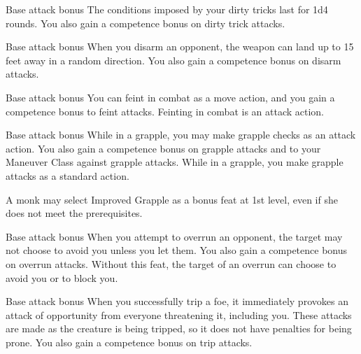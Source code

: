  Base attack bonus 
 The conditions imposed by your dirty tricks last for 1d4 rounds. You also gain a  competence bonus on dirty trick attacks.

 Base attack bonus 
 When you disarm an opponent, the weapon can land up to 15 feet away in a random direction. You also gain a  competence bonus on disarm attacks.

 Base attack bonus 
 You can feint in combat as a move action, and you gain a  competence bonus to feint attacks.
 Feinting in combat is an attack action.

 Base attack bonus 
 While in a grapple, you may make grapple checks as an attack action. You also gain a  competence bonus on grapple attacks and to your Maneuver Class against grapple attacks.
 While in a grapple, you make grapple attacks as a standard action.
\par A monk may select Improved Grapple as a bonus feat at 1st level, even if she does not meet the prerequisites.

 Base attack bonus 
 When you attempt to overrun an opponent, the target may not choose to avoid you unless you let them. You also gain a  competence bonus on overrun attacks.
 Without this feat, the target of an overrun can choose to avoid you or to block you.

\begin{comment}
\feat{Improved Sunder}{Combat, Maneuver}
\parhead{Prerequisites} Base attack bonus \plus4
\parhead{Benefit} When you strike at an object held or carried by an opponent (such as a weapon or shield), you ignore half the hardness of the sundered item. You also gain a \plus2 competence bonus on sunder attacks.
\end{comment}

 Base attack bonus 
 When you successfully trip a foe, it immediately provokes an attack of opportunity from everyone threatening it, including you. These attacks are made as the creature is being tripped, so it does not have penalties for being prone. You also gain a  competence bonus on trip attacks.

